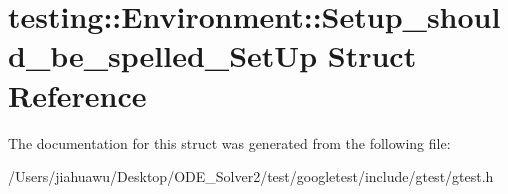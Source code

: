 \hypertarget{structtesting_1_1_environment_1_1_setup__should__be__spelled___set_up}{}\section{testing\+:\+:Environment\+:\+:Setup\+\_\+should\+\_\+be\+\_\+spelled\+\_\+\+Set\+Up Struct Reference}
\label{structtesting_1_1_environment_1_1_setup__should__be__spelled___set_up}


The documentation for this struct was generated from the following file\+:\begin{DoxyCompactItemize}
\item 
/\+Users/jiahuawu/\+Desktop/\+O\+D\+E\+\_\+\+Solver2/test/googletest/include/gtest/gtest.\+h\end{DoxyCompactItemize}
